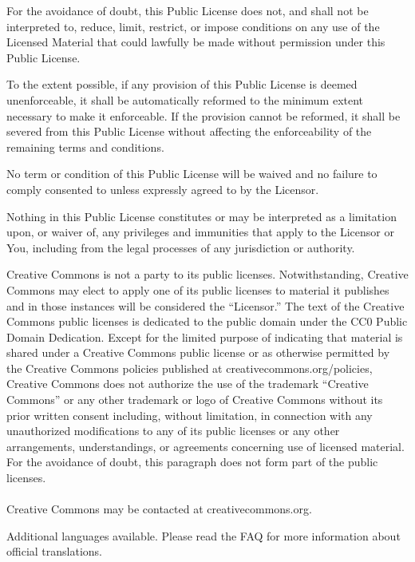 \begin{doclicense@enumerate}
\item For the avoidance of doubt, this Public License does not, and shall not be interpreted to, reduce, limit, restrict, or impose conditions on any use of the Licensed Material that could lawfully be made without permission under this Public License.
\item To the extent possible, if any provision of this Public License is deemed unenforceable, it shall be automatically reformed to the minimum extent necessary to make it enforceable. If the provision cannot be reformed, it shall be severed from this Public License without affecting the enforceability of the remaining terms and conditions.
\item No term or condition of this Public License will be waived and no failure to comply consented to unless expressly agreed to by the Licensor.
\item Nothing in this Public License constitutes or may be interpreted as a limitation upon, or waiver of, any privileges and immunities that apply to the Licensor or You, including from the legal processes of any jurisdiction or authority.
\end{doclicense@enumerate}

\par Creative Commons is not a party to its public licenses. Notwithstanding, Creative Commons may elect to apply one of its public licenses to material it publishes and in those instances will be considered the “Licensor.” The text of the Creative Commons public licenses is dedicated to the public domain under the CC0 Public Domain Dedication. Except for the limited purpose of indicating that material is shared under a Creative Commons public license or as otherwise permitted by the Creative Commons policies published at creativecommons.org/policies, Creative Commons does not authorize the use of the trademark “Creative Commons” or any other trademark or logo of Creative Commons without its prior written consent including, without limitation, in connection with any unauthorized modifications to any of its public licenses or any other arrangements, understandings, or agreements concerning use of licensed material. For the avoidance of doubt, this paragraph does not form part of the public licenses.\\\\
Creative Commons may be contacted at creativecommons.org.
\par Additional languages available. Please read the FAQ for more information about official translations.



